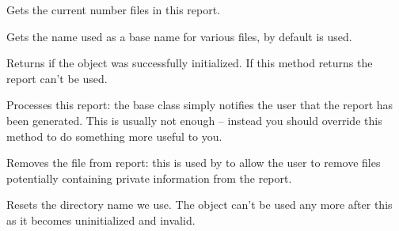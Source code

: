 
Gets the current number files in this report.


\label{wxdebugreportgetreportname}


Gets the name used as a base name for various files, by default 
 is used.


\label{wxdebugreportisok}


Returns \true if the object was successfully initialized. If this method returns 
\false the report can't be used.


\label{wxdebugreportprocess}


Processes this report: the base class simply notifies the user that the
report has been generated. This is usually not enough -- instead you
should override this method to do something more useful to you.


\label{wxdebugreportremovefile}


Removes the file from report: this is used by 
 to allow the user to
remove files potentially containing private information from the report.


\label{wxdebugreportreset}


Resets the directory name we use. The object can't be used any more after
this as it becomes uninitialized and invalid.

